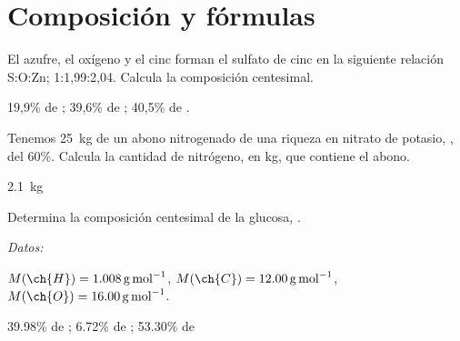\documentclass[10pt,a5paper,twoside]{article}
\newenvironment{gexdatos}{
      \vspace{2pt}
      \noindent\small\textit{Datos:}
    }{\vspace{5pt}}
\begin{document}
\section{Composición y fórmulas}

  \begin{exercise}[
      tags    = {termodinámica, entalpía, entalpia de reacción, calor},
      topics  = {química, termoquímica, termodinámica},
      source  = {FQ 1B OXF 2015, p43, e40},
    ]
    El azufre, el oxígeno y el cinc forman el sulfato de cinc en la siguiente relación S:O:Zn; 1:1,99:2,04. Calcula la composición centesimal.
  \end{exercise}

  \begin{solution}
    19,9\% de ; 39,6\% de ; 40,5\% de .
  \end{solution}




  \begin{exercise}[
      tags    = {termodinámica, entalpía, entalpia de reacción, calor},
      topics  = {química, termoquímica, termodinámica},
      source  = {FQ 1B OXF 2015, p43, e41},
    ]
    Tenemos \SI{25}{\kilo\gram} de un abono nitrogenado de una riqueza en nitrato de potasio, , del 60\%. Calcula la cantidad de nitrógeno, en \si{\kilo\gram}, que contiene el abono.
  \end{exercise}

  \begin{solution}
    \SI{2.1}{\kilo\gram}
  \end{solution}



  \begin{exercise}[
      tags    = {termodinámica, entalpía, entalpia de reacción, calor},
      topics  = {química, termoquímica, termodinámica},
      source  = {FQ 1B SAN 2015, p43, e43},
    ]
    Determina la composición centesimal de la glucosa, .

    \begin{gexdatos}
      \( M(\ch{H}) = \SI{1.008}{\gram\per\mole} \),
      \( M(\ch{C}) = \SI{12.00}{\gram\per\mole} \),
      \( M(\ch{O}) = \SI{16.00}{\gram\per\mole} \).
    \end{gexdatos}
  \end{exercise}

  \begin{solution}
    39.98\% de ; 6.72\% de ; 53.30\% de 
  \end{solution}
\end{document}
